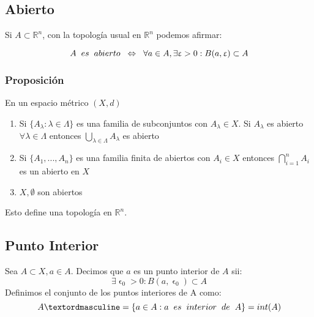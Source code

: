 \documentclass[11pt]{article}
\begin{document}
\subsection*{Abierto}
Si $A\subset \mathbb{R}^n$, con la topología usual en $\mathbb{R}^n$ podemos afirmar:

\[
A \hspace{0.2cm} es \hspace{0.2cm}abierto \hspace{0.2cm}\Leftrightarrow \hspace{0.2cm} \forall a \in A, \exists \upvarepsilon > 0 : B(a,\upvarepsilon)\subset A
\]



\subsubsection*{Proposición}

En un espacio métrico $(X,d)$
\begin{enumerate}
	\item Si $\{ A_\lambda : \lambda \in \Lambda\}$ es una familia de subconjuntos con $A_\lambda \in X$. Si $A_\lambda$ es abierto $\forall \lambda \in \Lambda$ entonces $\bigcup_{\lambda \in \Lambda}A_\lambda$ es abierto

	\item Si $\{A_1,...,A_n\}$ es una familia finita de abiertos con $A_i \in X $ entonces $\bigcap_{i=1}^n A_i$ es un abierto en $X$

	\item $X, \emptyset$ son abiertos

\end{enumerate}

Esto define una topología en $\mathbb{R}^n$.

\subsection*{Punto Interior}

Sea $A\subset X, a \in A$. Decimos que $a$ es un punto interior de $A$ sii:
\[
\exists \upvarepsilon_0 > 0: B(a,\upvarepsilon_0) \subset A
\]
Definimos el conjunto de los puntos interiores de A como:
\[
Aº = \{ a\in A: a \hspace{0.2cm} es \hspace{0.2cm} interior\hspace{0.2cm}de \hspace{0.2cm}A \} = int(A)
\]
\end{document}
